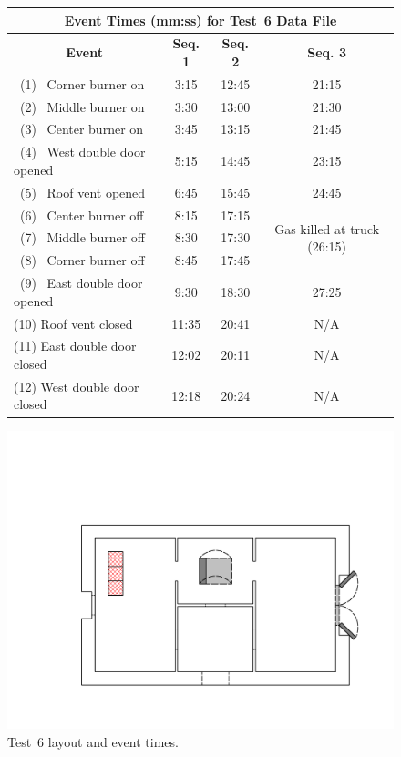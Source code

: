\documentclass[12pt,oneside]{book}
\begin{document}
\begin{figure}[!ht]
\begin{minipage}[b]{0.8\columnwidth}
	\begin{flushleft}
	\small
	\begin{tabular}{lccc}
	\multicolumn{4}{c}{\normalsize Event Times (mm:ss) for Test~6 Data File} \\
	\toprule
	\multicolumn{1}{c}{\textbf{Event}} & \textbf{Seq. 1} & \textbf{Seq. 2} & \textbf{Seq. 3} \\
	\midrule
	~(1)~  Corner burner on 		&	3:15	&	12:45	&	21:15	\\
	~(2)~  Middle burner on 		&	3:30	&	13:00	&	21:30	\\
	~(3)~  Center burner on 		&	3:45	&	13:15	&	21:45	\\
	~(4)~  West double door opened 	&	5:15	&   14:45	&	23:15	\\
	~(5)~  Roof vent opened 		&	6:45	&	15:45 	&	24:45 	\\
	~(6)~  Center burner off 		&	8:15	&   17:15	&	\multirow{3}{*}{Gas killed at truck (26:15)} \\
	~(7)~  Middle burner off		&	8:30	&   17:30	&	\\
	~(8)~  Corner burner off 		&	8:45	&   17:45	&	\\
	~(9)~  East double door opened	&	9:30	&   18:30	&	27:25	\\
	(10) Roof vent closed 			&	11:35	&   20:41	&	N/A		\\
	(11) East double door closed	&	12:02 	&	20:11	&	N/A 	\\
	(12) West double door closed	&	12:18 	&	20:24	&	N/A		\\
	\bottomrule
	\end{tabular}
	\end{flushleft}
\end{minipage}
\begin{minipage}[b]{0.9\columnwidth}
	\vspace{15pt}
	\centering
	\includegraphics[width=\columnwidth]{../Figures/Floor_Plans/East_Structure_Test_6}
\end{minipage}
\caption{Test~6 layout and event times.}
\label{fig:east_test_6}
\end{figure}
\FloatBarrier
\end{document}
